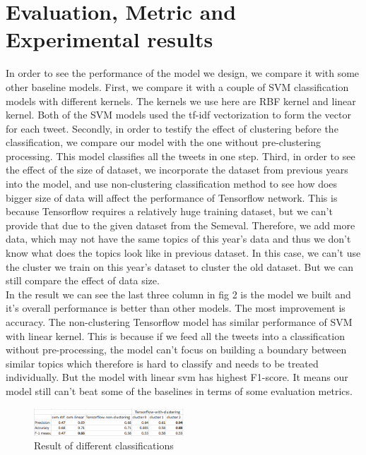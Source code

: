 \documentclass[conference]{IEEEtran}
\begin{document}
\section{Evaluation, Metric and Experimental results}
In order to see the performance of the model we design, we compare it with some other baseline models. First, we compare it with a couple of SVM classification models with different kernels. The kernels we use here are RBF kernel and linear kernel. Both of the SVM models used the tf-idf vectorization to form the vector for each tweet. Secondly, in order to testify the effect of clustering before the classification, we compare our model with the one without pre-clustering processing. This model classifies all the tweets in one step.
Third, in order to see the effect of the size of dataset, we incorporate the dataset from previous years into the model, and use non-clustering classification method to see how does bigger size of data will affect the performance of Tensorflow network. This is because Tensorflow requires a relatively huge training dataset, but we can't provide that due to the given dataset from the Semeval. Therefore, we add more data, which may not have the same topics of this year's data and thus we don't know what does the topics look like in previous dataset. In this case, we can't use the cluster we train on this year's dataset to cluster the old dataset. But we can still compare the effect of data size.
\\ \indent
In the result we can see the last three column in fig 2 is the model we built and it's overall performance is better than other models. The most improvement is accuracy. The non-clustering Tensorflow model has similar performance of SVM with linear kernel. This is because if we feed all the tweets into a classification without pre-processing, the model can't focus on building a boundary between similar topics which therefore is hard to classify and needs to be treated individually. But the model with linear svm has highest F1-score. It means our model still can't beat some of the baselines in terms of some evaluation metrics.

\begin{figure}[h]
\centering
\includegraphics[width=0.5\textwidth]{Capture}
\caption{Result of different classifications}

\end{figure}
\end{document}
